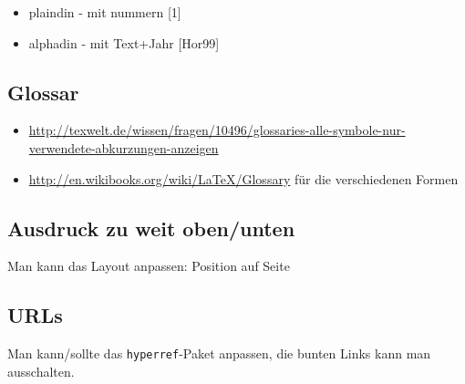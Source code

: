 \begin{itemize}
\tightlist
\item
  plaindin - mit nummern {[}1{]}
\item
  alphadin - mit Text+Jahr {[}Hor99{]}
\end{itemize}

\hypertarget{glossar}{%
\subsection{Glossar}\label{glossar}}

\begin{itemize}
\tightlist
\item
  \url{http://texwelt.de/wissen/fragen/10496/glossaries-alle-symbole-nur-verwendete-abkurzungen-anzeigen}
\item
  \url{http://en.wikibooks.org/wiki/LaTeX/Glossary} für die
  verschiedenen Formen
\end{itemize}

\hypertarget{ausdruck-zu-weit-obenunten}{%
\subsection{Ausdruck zu weit
oben/unten}\label{ausdruck-zu-weit-obenunten}}

Man kann das Layout anpassen: Position auf Seite

\begin{Shaded}
\begin{Highlighting}[]
\NormalTok{10mm}
\end{Highlighting}
\end{Shaded}

\hypertarget{urls}{%
\subsection{URLs}\label{urls}}

Man kann/sollte das \texttt{hyperref}-Paket anpassen, die bunten Links
kann man ausschalten.

\begin{Shaded}
\end{Shaded}

